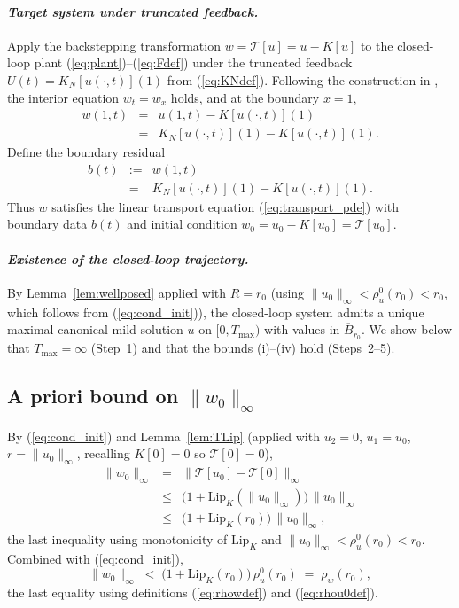 \documentclass[10pt,a4paper]{amsart}
\newcommand{\Tcal}{\mathcal{T}}
\newcommand{\Lipk}{\mathrm{Lip}_K}
\begin{document}
\paragraph*{\normalfont\em Target system under truncated feedback.}
Apply the backstepping transformation $w = \Tcal[u] = u - K[u]$ to the closed-loop plant (\ref{eq:plant})--(\ref{eq:Fdef}) under the truncated feedback $U(t) = K_N[u(\cdot,t)](1)$ from (\ref{eq:KNdef}). Following the construction in \cite{krstic2026feedbacklinearizationhyperbolicpdes}, the interior equation $w_t = w_x$ holds, and at the boundary $x = 1$,
\begin{eqnarray}
w(1,t) &=& u(1,t) - K[u(\cdot,t)](1) \nonumber \\
&=& K_N[u(\cdot,t)](1) - K[u(\cdot,t)](1).
\label{eq:wbdy}
\end{eqnarray}
Define the boundary residual
\begin{eqnarray}
b(t) &:=& w(1,t) \nonumber \\
&=& K_N[u(\cdot,t)](1) - K[u(\cdot,t)](1).
\label{eq:bdef}
\end{eqnarray}
Thus $w$ satisfies the linear transport equation (\ref{eq:transport_pde}) with boundary data $b(t)$ and initial condition $w_0 = u_0 - K[u_0] = \Tcal[u_0]$.

\paragraph*{\normalfont\em Existence of the closed-loop trajectory.}
By Lemma~\ref{lem:wellposed} applied with $R = r_0$ (using $\|u_0\|_\infty < \rho_u^0(r_0) < r_0$, which follows from (\ref{eq:cond_init})), the closed-loop system admits a unique maximal canonical mild solution $u$ on $[0, T_{\max})$ with values in $\overline B_{r_0}$. We show below that $T_{\max} = \infty$ (Step~1) and that the bounds (i)--(iv) hold (Steps~2--5).

\subsection*{A priori bound on $\|w_0\|_\infty$}

By (\ref{eq:cond_init}) and Lemma~\ref{lem:TLip} (applied with $u_2 = 0$, $u_1 = u_0$, $r = \|u_0\|_\infty$, recalling $K[0] = 0$ so $\Tcal[0] = 0$),
\begin{eqnarray}
\|w_0\|_\infty &=& \|\Tcal[u_0] - \Tcal[0]\|_\infty \nonumber \\
&\le& \bigl(1 + \Lipk(\|u_0\|_\infty)\bigr)\,\|u_0\|_\infty \nonumber \\
&\le& \bigl(1 + \Lipk(r_0)\bigr)\,\|u_0\|_\infty,
\label{eq:w0_bound}
\end{eqnarray}
the last inequality using monotonicity of $\Lipk$ and $\|u_0\|_\infty < \rho_u^0(r_0) < r_0$. Combined with (\ref{eq:cond_init}),
\begin{equation}
\|w_0\|_\infty \;<\; \bigl(1 + \Lipk(r_0)\bigr)\,\rho_u^0(r_0) \;=\; \rho_w(r_0),
\label{eq:w0_in_ball}
\end{equation}
the last equality using definitions (\ref{eq:rhowdef}) and (\ref{eq:rhou0def}).
\end{document}

